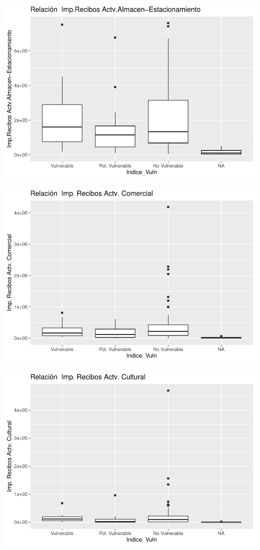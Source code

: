 \documentclass[notspecified,article,submit,moreauthors,pdftex]{Definitions/mdpi}
\begin{document}
\begin{center}\includegraphics{./figure/unnamed-chunk-23-20} \end{center}

\begin{center}\includegraphics{./figure/unnamed-chunk-23-21} \end{center}

\begin{center}\includegraphics{./figure/unnamed-chunk-23-22} \end{center}
\end{document}
